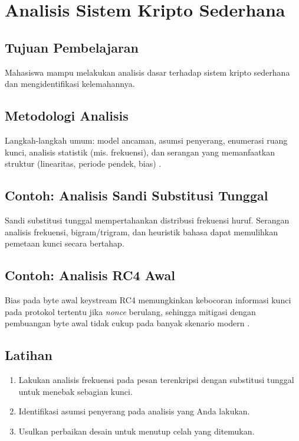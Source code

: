 \documentclass[../main.tex]{subfiles}
\begin{document}
\chapter{Analisis Sistem Kripto Sederhana}

\section{Tujuan Pembelajaran}
Mahasiswa mampu melakukan analisis dasar terhadap sistem kripto sederhana dan mengidentifikasi kelemahannya.

\section{Metodologi Analisis}
Langkah-langkah umum: model ancaman, asumsi penyerang, enumerasi ruang kunci, analisis statistik (mis. frekuensi), dan serangan yang memanfaatkan struktur (linearitas, periode pendek, bias) \citep{stallings}.

\section{Contoh: Analisis Sandi Substitusi Tunggal}
Sandi substitusi tunggal mempertahankan distribusi frekuensi huruf. Serangan analisis frekuensi, bigram/trigram, dan heuristik bahasa dapat memulihkan pemetaan kunci secara bertahap.

\section{Contoh: Analisis RC4 Awal}
Bias pada byte awal keystream RC4 memungkinkan kebocoran informasi kunci pada protokol tertentu jika \emph{nonce} berulang, sehingga mitigasi dengan pembuangan byte awal tidak cukup pada banyak skenario modern \citep{rc4}.

\section{Latihan}
\begin{enumerate}
  \item Lakukan analisis frekuensi pada pesan terenkripsi dengan substitusi tunggal untuk menebak sebagian kunci.
  \item Identifikasi asumsi penyerang pada analisis yang Anda lakukan.
  \item Usulkan perbaikan desain untuk menutup celah yang ditemukan.
\end{enumerate}
\end{document}

